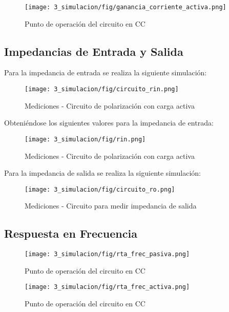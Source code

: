 \begin{figure}[H]
    \centering
    \texttt{[image: 3\_simulacion/fig/ganancia\_corriente\_activa.png]}
    \label{mediciones_pol_activa}
    \caption{Punto de operación del circuito en CC}
\end{figure}



\subsection{Impedancias de Entrada y Salida}
Para la impedancia de entrada se realiza la siguiente simulación:
\begin{figure}[H]
    \centering
    \texttt{[image: 3\_simulacion/fig/circuito\_rin.png]}
    \label{mediciones_pol_activa}
    \caption{Mediciones - Circuito de polarización con carga activa}
\end{figure}
Obteniéndose los siguientes valores para la impedancia de entrada:
\begin{figure}[H]
    \centering
    \texttt{[image: 3\_simulacion/fig/rin.png]}
    \label{mediciones_pol_activa}
    \caption{Mediciones - Circuito de polarización con carga activa}
\end{figure}

Para la impedancia de salida se realiza la siguiente simulación:
\begin{figure}[H]
    \centering
    \texttt{[image: 3\_simulacion/fig/circuito\_ro.png]}
    \label{mediciones_pol_activa}
    \caption{Mediciones - Circuito para medir impedancia de salida}
\end{figure}

\subsection{Respuesta en Frecuencia}
\begin{figure}[H]
    \centering
    \texttt{[image: 3\_simulacion/fig/rta\_frec\_pasiva.png]}
    \label{mediciones_pol_activa}
    \caption{Punto de operación del circuito en CC}
\end{figure}

\begin{figure}[H]
    \centering
    \texttt{[image: 3\_simulacion/fig/rta\_frec\_activa.png]}
    \label{mediciones_pol_activa}
    \caption{Punto de operación del circuito en CC}
\end{figure}


